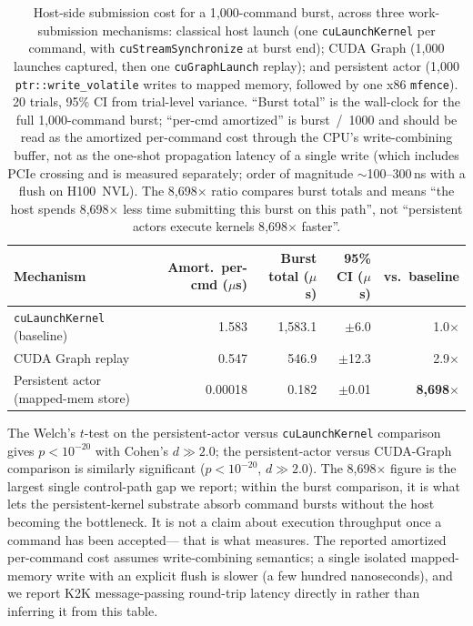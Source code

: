 \begin{table}[htbp]
\centering
\footnotesize
\setlength{\tabcolsep}{4pt}
\begin{tabular}{lrrrr}
\toprule
Mechanism & Amort.\ per-cmd ($\mu$s) & Burst total ($\mu$s) & 95\% CI ($\mu$s) & vs.\ baseline \\
\midrule
\texttt{cuLaunchKernel} (baseline)   & 1.583   & 1{,}583.1 & $\pm$6.0  & 1.0$\times$ \\
CUDA Graph replay                    & 0.547   &    546.9  & $\pm$12.3 & 2.9$\times$ \\
Persistent actor (mapped-mem store)  & 0.00018 &      0.182 & $\pm$0.01 & \textbf{8{,}698$\times$} \\
\bottomrule
\end{tabular}
\caption{Host-side submission cost for a 1{,}000-command burst,
across three work-submission mechanisms: classical host launch
(one \texttt{cuLaunchKernel} per command, with
\texttt{cuStreamSynchronize} at burst end); CUDA Graph (1{,}000
launches captured, then one \texttt{cuGraphLaunch} replay); and
persistent actor (1{,}000 \texttt{ptr::write\_volatile} writes to
mapped memory, followed by one x86 \texttt{mfence}).  20 trials,
95\% CI from trial-level variance.  ``Burst total'' is the
wall-clock for the full 1{,}000-command burst; ``per-cmd
amortized'' is burst~/~1000 and should be read as the amortized
per-command cost through the CPU's write-combining buffer, not
as the one-shot propagation latency of a single write (which
includes PCIe crossing and is measured separately; order of
magnitude \(\sim\)100--300\,ns with a flush on H100~NVL).  The
8{,}698$\times$ ratio compares burst totals and means ``the host
spends 8{,}698$\times$ less time submitting this burst on this
path'', not ``persistent actors execute kernels 8{,}698$\times$
faster''.}
\label{tab:injection}
\end{table}

The Welch's \(t\)-test on the persistent-actor versus
\texttt{cuLaunchKernel} comparison gives \(p < 10^{-20}\) with
Cohen's \(d \gg 2.0\); the persistent-actor versus CUDA-Graph
comparison is similarly significant (\(p < 10^{-20}\), \(d \gg
2.0\)).  The 8{,}698$\times$ figure is the largest single
control-path gap we report; within the burst comparison, it is
what lets the persistent-kernel substrate absorb command bursts
without the host becoming the bottleneck.  It is not a claim
about execution throughput once a command has been accepted---%
that is what  measures.  The reported
amortized per-command cost assumes write-combining semantics; a
single isolated mapped-memory write with an explicit flush is
slower (a few hundred nanoseconds), and we report K2K
message-passing round-trip latency directly in
 rather than inferring it from this
table.

